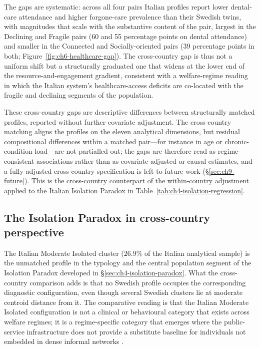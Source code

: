  The gaps are systematic: across all four pairs Italian profiles report lower dental-care attendance and higher forgone-care prevalence than their Swedish twins, with magnitudes that scale with the substantive content of the pair, largest in the Declining and Fragile pairs (60 and 55 percentage points on dental attendance) and smaller in the Connected and Socially-oriented pairs (39 percentage points in both; Figure~\ref{fig:ch6-healthcare-gap}). The cross-country gap is thus not a uniform shift but a structurally graduated one that widens at the lower end of the resource-and-engagement gradient, consistent with a welfare-regime reading in which the Italian system's healthcare-access deficits are co-located with the fragile and declining segments of the population.

These cross-country gaps are descriptive differences between structurally matched profiles, reported without further covariate adjustment. The cross-country matching aligns the profiles on the eleven analytical dimensions, but residual compositional differences within a matched pair---for instance in age or chronic-condition load---are not partialled out; the gaps are therefore read as regime-consistent associations rather than as covariate-adjusted or causal estimates, and a fully adjusted cross-country specification is left to future work (\S\ref{sec:ch9-future}). This is the cross-country counterpart of the within-country adjustment applied to the Italian Isolation Paradox in Table~\ref{tab:ch4-isolation-regression}.

\subsection{The Isolation Paradox in cross-country perspective}
\label{sec:ch6-isolation-paradox-comparative}

The Italian Moderate Isolated cluster (26.9\% of the Italian analytical sample) is the unmatched profile in the typology and the central population segment of the Isolation Paradox developed in \S\ref{sec:ch4-isolation-paradox}. What the cross-country comparison adds is that no Swedish profile occupies the corresponding diagnostic configuration, even though several Swedish clusters lie at moderate centroid distance from it. The comparative reading is that the Italian Moderate Isolated configuration is not a clinical or behavioural category that exists across welfare regimes; it is a regime-specific category that emerges where the public-service infrastructure does not provide a substitute baseline for individuals not embedded in dense informal networks \citep{loscalzo2009}.

